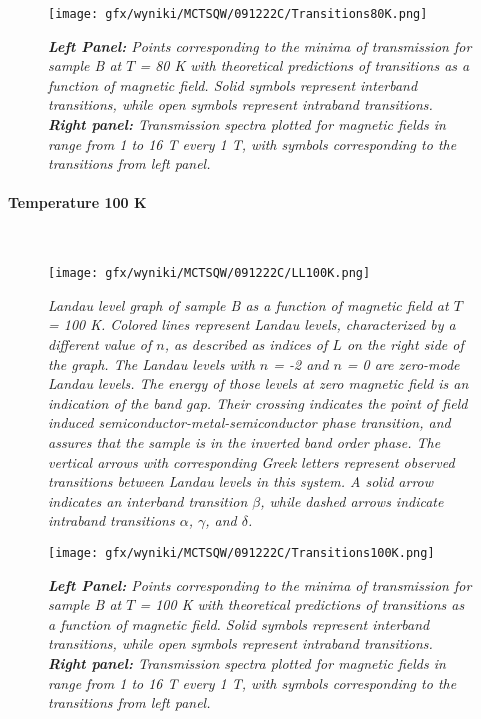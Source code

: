 \documentclass[titlepage,a4paper]{book}
\newcommand{\wciecie}{\quad\phantom{v}}
\newcommand{\myparagraph}[1]{\paragraph{#1}\mbox{}\\}
\begin{document}
\begin{figure}[H]
	\centering
	\texttt{[image: gfx/wyniki/MCTSQW/091222C/Transitions80K.png]}
	\vspace{-10pt}
	\caption{\textit{\textbf{Left Panel:} Points corresponding to the minima of transmission for sample B at $T$ = 80 K with theoretical predictions of transitions as a function of magnetic field. Solid symbols represent interband transitions, while open symbols represent intraband transitions. \textbf{Right panel:} Transmission spectra plotted for magnetic fields in range from 1 to 16 T every 1 T, with symbols corresponding to the transitions from left panel.}}
	\label{fig:Summary_SQW_80K}
\end{figure}


\clearpage
\myparagraph{Temperature 100 K}
\wciecie
\begin{figure}[H]
	\centering
	\texttt{[image: gfx/wyniki/MCTSQW/091222C/LL100K.png]}
	\vspace{-10pt}
	\caption{\textit{Landau level graph of sample B as a function of magnetic field at $T$ = 100 K. Colored lines represent Landau levels, characterized by a different value of $n$, as described as indices of $L$ on the right side of the graph. The Landau levels with $n$ = -2 and $n$ = 0 are zero-mode Landau levels. The energy of those levels at zero magnetic field is an indication of the band gap. Their crossing indicates the point of field induced semiconductor-metal-semiconductor phase transition, and assures that the sample is in the inverted band order phase. The vertical arrows with corresponding Greek letters represent observed transitions between Landau levels in this system. A solid arrow indicates an interband transition $\beta$, while dashed arrows indicate intraband transitions $\alpha$, $\gamma$, and $\delta$.}}
	\label{fig:LL_SQW_100K}
\end{figure}

\begin{figure}[H]
	\centering
	\texttt{[image: gfx/wyniki/MCTSQW/091222C/Transitions100K.png]}
	\vspace{-10pt}
	\caption{\textit{\textbf{Left Panel:} Points corresponding to the minima of transmission for sample B at $T$ = 100 K with theoretical predictions of transitions as a function of magnetic field. Solid symbols represent interband transitions, while open symbols represent intraband transitions. \textbf{Right panel:} Transmission spectra plotted for magnetic fields in range from 1 to 16 T every 1 T, with symbols corresponding to the transitions from left panel.}}
	\label{fig:Summary_SQW_100K}
\end{figure}
\end{document}
